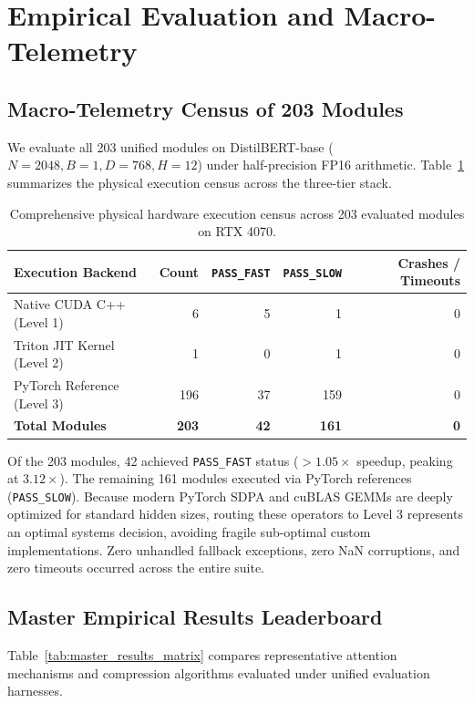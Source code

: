 \documentclass{article}
\newcommand{\passfast}{\texttt{PASS\_FAST}}
\newcommand{\passslow}{\texttt{PASS\_SLOW}}
\begin{document}
\section{Empirical Evaluation and Macro-Telemetry}
\label{sec:experiments}

\subsection{Macro-Telemetry Census of 203 Modules}
We evaluate all 203 unified modules on DistilBERT-base ($N=2048, B=1, D=768, H=12$) under half-precision FP16 arithmetic. Table~\ref{tab:neurips_dispatch} summarizes the physical execution census across the three-tier stack.

\begin{table}[ht]
\centering
\caption{Comprehensive physical hardware execution census across 203 evaluated modules on RTX 4070.}
\label{tab:neurips_dispatch}
\begin{tabular}{lrrrr}
\toprule
\textbf{Execution Backend} & \textbf{Count} & \textbf{\passfast{}} & \textbf{\passslow{}} & \textbf{Crashes / Timeouts} \\
\midrule
Native CUDA C++ (Level 1) & 6 & 5 & 1 & 0 \\
Triton JIT Kernel (Level 2) & 1 & 0 & 1 & 0 \\
PyTorch Reference (Level 3) & 196 & 37 & 159 & 0 \\
\midrule
\textbf{Total Modules} & \textbf{203} & \textbf{42} & \textbf{161} & \textbf{0} \\
\bottomrule
\end{tabular}
\end{table}

Of the 203 modules, 42 achieved \passfast{} status ($>1.05\times$ speedup, peaking at $3.12\times$). The remaining 161 modules executed via PyTorch references (\passslow{}). Because modern PyTorch SDPA and cuBLAS GEMMs are deeply optimized for standard hidden sizes, routing these operators to Level 3 represents an optimal systems decision, avoiding fragile sub-optimal custom implementations. Zero unhandled fallback exceptions, zero NaN corruptions, and zero timeouts occurred across the entire suite.

\subsection{Master Empirical Results Leaderboard}
Table~\ref{tab:master_results_matrix} compares representative attention mechanisms and compression algorithms evaluated under unified evaluation harnesses.
\end{document}
